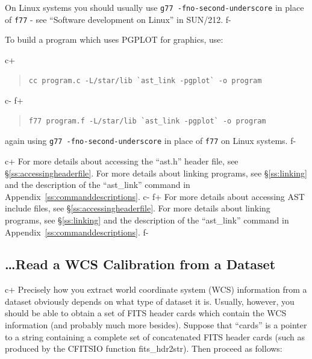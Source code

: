 \documentclass[twoside,11pt]{article}
\newcommand{\xref}[3]{#1}
\newcommand{\appref}[1]{Appendix~\ref{#1}}
\newcommand{\secref}[1]{\S\ref{#1}}
\newcommand{\appref}[1]{\ref{#1}}
\newcommand{\secref}[1]{\ref{#1}}
\begin{document}
On Linux systems you should usually use \verb+g77 -fno-second-underscore+ in
place of \verb+f77+ - see \xref{``Software development on Linux''}{sun212}
{software_development_on_linux} in \xref{SUN/212}{sun212}{}. 
f-

To build a program which uses PGPLOT for graphics, use:

c+
\begin{quote}
\small
\begin{verbatim}
cc program.c -L/star/lib `ast_link -pgplot` -o program
\end{verbatim}
\normalsize
\end{quote}
c-
f+
\begin{quote}
\small
\begin{verbatim}
f77 program.f -L/star/lib `ast_link -pgplot` -o program
\end{verbatim}
\normalsize
\end{quote}

again using \verb+g77 -fno-second-underscore+ in place of \verb+f77+ 
on Linux systems.
f-

c+
For more details about accessing the ``ast.h'' header file, see
\secref{ss:accessingheaderfile}. For more
details about linking programs, see \secref{ss:linking} and the
description of the ``ast\_link'' command in
\appref{ss:commanddescriptions}.
c-
f+
For more details about accessing AST include files, see
\secref{ss:accessingheaderfile}. For more
details about linking programs, see \secref{ss:linking} and the
description of the ``ast\_link'' command in
\appref{ss:commanddescriptions}.
f-

\subsection{\label{ss:howtoreadwcs}\ldots Read a WCS Calibration from a Dataset}

c+
Precisely how you extract world coordinate system (WCS) information
from a dataset obviously depends on what type of dataset it
is. Usually, however, you should be able to obtain a set of FITS
header cards which contain the WCS information (and probably much more
besides). Suppose that ``cards'' is a pointer to a string 
containing a complete set of concatenated FITS header cards (such as
produced by the CFITSIO function fits\_hdr2str). Then proceed as follows:
\end{document}
